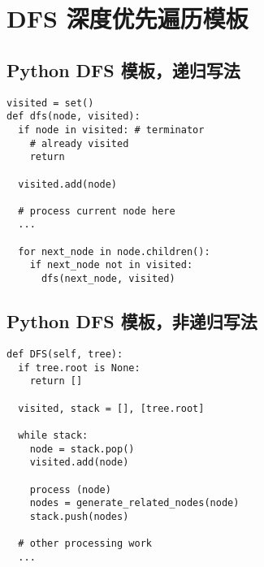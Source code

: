 \newpage
\section{DFS 深度优先遍历模板}

\subsection{Python DFS 模板，递归写法}

\begin{verbatim}
visited = set()
def dfs(node, visited):
  if node in visited: # terminator
    # already visited
    return
  
  visited.add(node)

  # process current node here
  ...

  for next_node in node.children():
    if next_node not in visited:
      dfs(next_node, visited)
\end{verbatim}

\subsection{Python DFS 模板，非递归写法}

\begin{verbatim}
def DFS(self, tree):
  if tree.root is None:
    return []

  visited, stack = [], [tree.root]

  while stack:
    node = stack.pop()
    visited.add(node)

    process (node)
    nodes = generate_related_nodes(node)
    stack.push(nodes)
  
  # other processing work
  ...
\end{verbatim}

